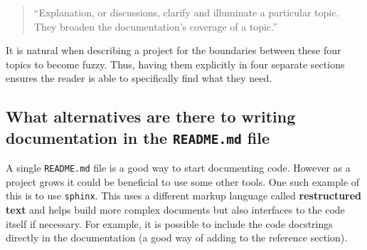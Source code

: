 \begin{quote}
``Explanation, or discussions, clarify and illuminate a particular topic. They
broaden the documentation’s coverage of a topic.''
\end{quote}


It is natural when describing a project for the boundaries between these four
topics to become fuzzy. Thus, having them explicitly in four separate sections
ensures the reader is able to specifically find what they need.

\subsection{What alternatives are there to writing documentation in the \texttt{README.md} file}

A single \texttt{README.md} file is a good way to start documenting code. However as a
project grows it could be beneficial to use some other tools. One such example
of this is to use \texttt{sphinx}. This uses a
different markup language called \textbf{restructured text}
 and helps build more complex
documents but also interfaces to the code itself if necessary. For example, it
is possible to include the code docstrings directly in the documentation (a good
way of adding to the reference section).
